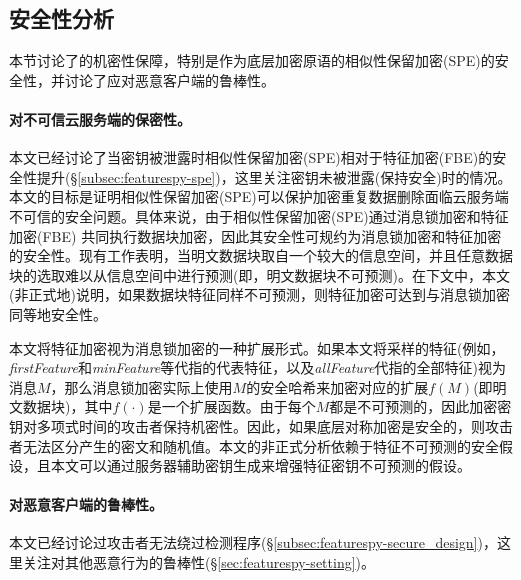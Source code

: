 
\subsection{安全性分析}
\label{subsec:featurespy-security}
本节讨论了\sysnameF 的机密性保障，特别是作为底层加密原语的相似性保留加密(SPE)的安全性，并讨论了\sysnameF 应对恶意客户端的鲁棒性。

\paragraph*{对不可信云服务端的保密性。}

本文已经讨论了当密钥被泄露时相似性保留加密(SPE)相对于特征加密(FBE)的安全性提升(\S\ref{subsec:featurespy-spe})，这里关注密钥未被泄露(保持安全)时的情况。本文的目标是证明相似性保留加密(SPE)可以保护加密重复数据删除面临云服务端不可信的安全问题。具体来说，由于相似性保留加密(SPE)通过消息锁加密和特征加密(FBE) 共同执行数据块加密，因此其安全性可规约为消息锁加密和特征加密的安全性。现有工作表明，当明文数据块取自一个较大的信息空间，并且任意数据块的选取难以从信息空间中进行预测(即，明文数据块不可预测)。在下文中，本文(非正式地)说明，如果数据块特征同样不可预测，则特征加密可达到与消息锁加密同等地安全性。

本文将特征加密视为消息锁加密的一种扩展形式。如果本文将采样的特征(例如，\textit{firstFeature}和\textit{minFeature}等代指的代表特征，以及\textit{allFeature}代指的全部特征)视为消息$M$，那么消息锁加密实际上使用$M$的安全哈希来加密对应的扩展$f(M)$(即明文数据块)，其中$f(\cdot)$是一个扩展函数。由于每个$M$都是不可预测的，因此加密密钥对多项式时间的攻击者保持机密性。因此，如果底层对称加密是安全的，则攻击者无法区分产生的密文和随机值。本文的非正式分析依赖于特征不可预测的安全假设，且本文可以通过服务器辅助密钥生成来增强特征密钥不可预测的假设。

\paragraph*{对恶意客户端的鲁棒性。}
本文已经讨论过攻击者无法绕过检测程序(\S\ref{subsec:featurespy-secure_design})，这里关注\sysnameF 对其他恶意行为的鲁棒性(\S\ref{sec:featurespy-setting})。

